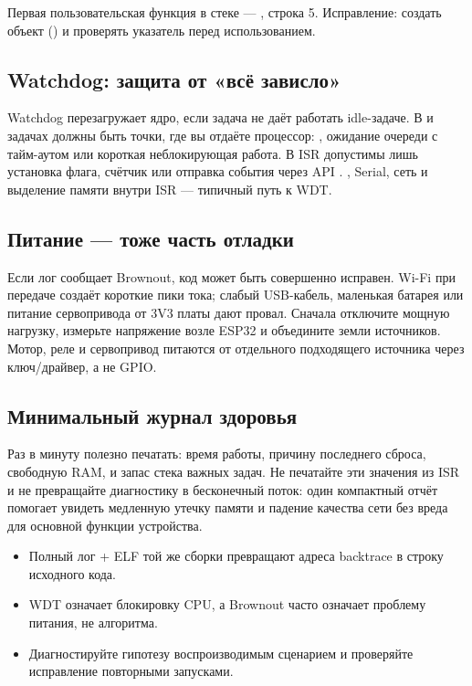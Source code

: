 Первая пользовательская функция в стеке --- , строка 5. Исправление: создать объект
() и проверять указатель перед использованием.


\subsection{Watchdog: защита от «всё зависло»}

Watchdog перезагружает ядро, если задача не даёт работать idle-задаче. В  и задачах
должны быть точки, где вы отдаёте процессор: , ожидание очереди с тайм-аутом или
короткая неблокирующая работа. В ISR допустимы лишь установка флага, счётчик или отправка события
через API . , Serial, сеть и выделение памяти внутри ISR --- типичный
путь к WDT.

\subsection{Питание --- тоже часть отладки}

Если лог сообщает Brownout, код может быть совершенно исправен. Wi-Fi при передаче создаёт короткие
пики тока; слабый USB-кабель, маленькая батарея или питание сервопривода от 3V3 платы дают провал.
Сначала отключите мощную нагрузку, измерьте напряжение возле ESP32 и объедините земли источников.
Мотор, реле и сервопривод питаются от отдельного подходящего источника через ключ/драйвер, а не GPIO.

\subsection{Минимальный журнал здоровья}

Раз в минуту полезно печатать: время работы, причину последнего сброса, свободную RAM,
 и запас стека важных задач. Не печатайте эти значения из ISR и не превращайте
диагностику в бесконечный поток: один компактный отчёт помогает увидеть медленную утечку памяти и
падение качества сети без вреда для основной функции устройства.

\begin{summary}
\begin{itemize}[leftmargin=*]
  \item Полный лог + ELF той же сборки превращают адреса backtrace в строку исходного кода.
  \item WDT означает блокировку CPU, а Brownout часто означает проблему питания, не алгоритма.
  \item Диагностируйте гипотезу воспроизводимым сценарием и проверяйте исправление повторными запусками.
\end{itemize}
\end{summary}

